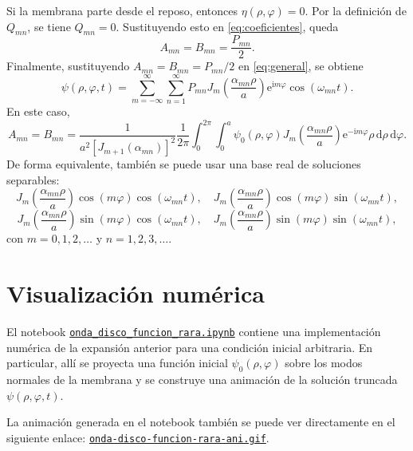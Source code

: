 \documentclass[11pt]{article}
\newcommand{\dd}{\,\mathrm{d}}
\newcommand{\ii}{\mathrm{i}}
\newcommand{\e}{\mathrm{e}}
\begin{document}
Si la membrana parte desde el reposo, entonces $\eta(\rho,\varphi)=0$. Por la definición de $Q_{mn}$, se tiene $Q_{mn}=0$. Sustituyendo esto en \eqref{eq:coeficientes}, queda
\[
A_{mn}=B_{mn}=\frac{P_{mn}}{2}.
\]
Finalmente, sustituyendo $A_{mn}=B_{mn}=P_{mn}/2$ en \eqref{eq:general}, se obtiene
\begin{equation}
\psi(\rho,\varphi,t)
=\sum_{m=-\infty}^{\infty}\sum_{n=1}^{\infty}
P_{mn}J_{m}\left(\frac{\alpha_{mn}\rho}{a}\right)\e^{\ii m\varphi}
\cos(\omega_{mn}t).
\label{eq:reposo}
\end{equation}
En este caso,
\[
A_{mn}=B_{mn}
=\frac{1}{a^2[J_{m+1}(\alpha_{mn})]^2}
\frac{1}{2\pi}\int_0^{2\pi}\int_0^a
\psi_0(\rho,\varphi)J_{m}\left(\frac{\alpha_{mn}\rho}{a}\right)\e^{-\ii m\varphi}\rho\dd\rho\dd\varphi.
\]
De forma equivalente, también se puede usar una base real de soluciones separables:
\[
J_m\left(\frac{\alpha_{mn}\rho}{a}\right)\cos(m\varphi)\cos(\omega_{mn}t),\quad
J_m\left(\frac{\alpha_{mn}\rho}{a}\right)\cos(m\varphi)\sin(\omega_{mn}t),
\]
\[
J_m\left(\frac{\alpha_{mn}\rho}{a}\right)\sin(m\varphi)\cos(\omega_{mn}t),\quad
J_m\left(\frac{\alpha_{mn}\rho}{a}\right)\sin(m\varphi)\sin(\omega_{mn}t),
\]
con $m=0,1,2,\ldots$ y $n=1,2,3,\ldots$.

\section*{Visualización numérica}

El notebook \href{https://github.com/jrosasep/ayudantias/blob/main/fisica-matematica-2/onda_2d_tambor_bessel/onda_disco_funcion_rara.ipynb}{\texttt{onda\_disco\_funcion\_rara.ipynb}} contiene una implementación numérica de la expansión anterior para una condición inicial arbitraria. En particular, allí se proyecta una función inicial $\psi_0(\rho,\varphi)$ sobre los modos normales de la membrana y se construye una animación de la solución truncada $\psi(\rho,\varphi,t)$.

La animación generada en el notebook también se puede ver directamente en el siguiente enlace: \href{https://github.com/jrosasep/ayudantias/blob/main/fisica-matematica-2/onda_2d_tambor_bessel/onda-disco-funcion-rara-ani.gif}{\texttt{onda-disco-funcion-rara-ani.gif}}.
\end{document}
